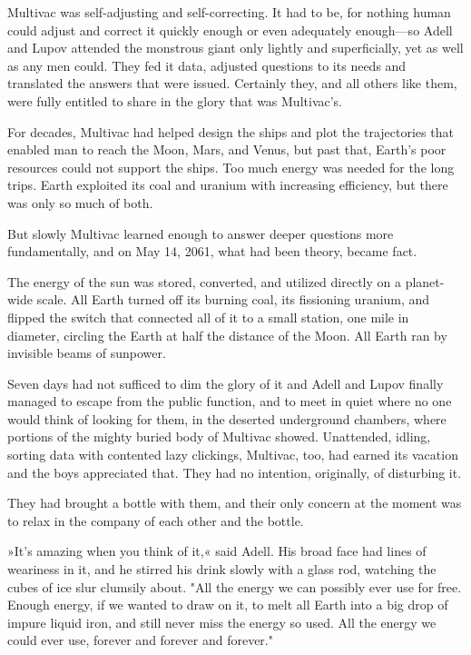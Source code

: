 \documentclass[11pt,twocolumn,paper=a5,pagesize]{article}
\newcommand{\q}[1]{»#1«}
\begin{document}
Multivac was self-adjusting and self-correcting. It had to be, for nothing 
human could adjust and correct it quickly enough or even adequately 
enough---so Adell and Lupov attended the monstrous giant only lightly and 
superficially, yet as well as any men could. They fed it data, adjusted 
questions to its needs and translated the answers that were issued. 
Certainly they, and all others like them, were fully entitled to share 
in the glory that was Multivac's.

For decades, Multivac had helped design the ships and plot the trajectories
that enabled man to reach the Moon, Mars, and Venus, but past that, 
Earth's poor resources could not support the ships. Too much energy was 
needed for the long trips. Earth exploited its coal and uranium with 
increasing efficiency, but there was only so much of both.

But slowly Multivac learned enough to answer deeper questions more 
fundamentally, and on May 14, 2061, what had been theory, became fact.

The energy of the sun was stored, converted, and utilized directly on a
planet-wide scale. All Earth turned off its burning coal, its 
fissioning uranium, and flipped the switch that connected all of it to
a small station, one mile in diameter, circling the Earth at half the 
distance of the Moon. All Earth ran by invisible beams of sunpower.

Seven days had not sufficed to dim the glory of it and Adell and Lupov finally managed to escape from the public function, and to meet in quiet where no one would think of looking for them, in the deserted underground chambers, where portions of the mighty buried body of Multivac showed. Unattended, idling, sorting data with contented lazy clickings, Multivac, too, had earned its vacation and the boys appreciated that. They had no intention, originally, of disturbing it.

They had brought a bottle with them, and their only concern at the moment was to relax in the company of each other and the bottle.

\q{It's amazing when you think of it,} said Adell. His broad face had lines of 
weariness in it, and he stirred his drink slowly with a glass rod, watching the cubes of ice slur clumsily about. "All the energy we can possibly ever use for free. Enough energy, if we wanted to draw on it, to melt all Earth into a big drop of impure liquid iron, and still never miss the energy so used. All the energy we could ever use, forever and forever and forever."
\end{document}
